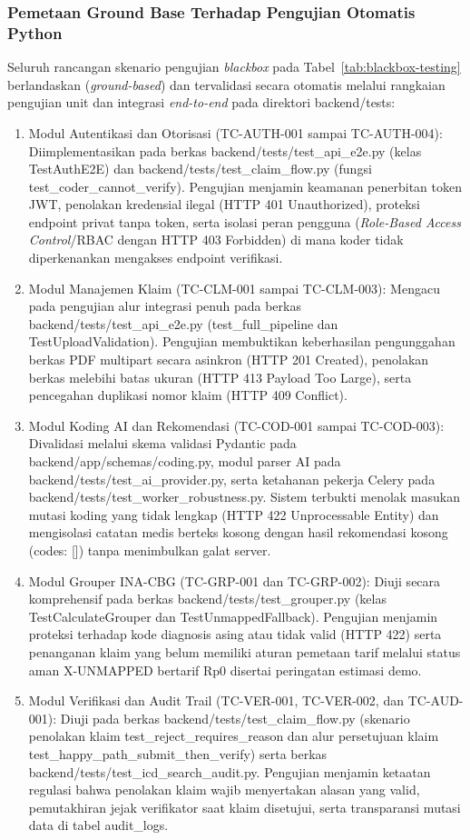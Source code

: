 \subsubsection{Pemetaan Ground Base Terhadap Pengujian Otomatis Python}
Seluruh rancangan skenario pengujian \textit{blackbox} pada Tabel~\ref{tab:blackbox-testing} berlandaskan (\textit{ground-based}) dan tervalidasi secara otomatis melalui rangkaian pengujian unit dan integrasi \textit{end-to-end} pada direktori backend/tests:
\begin{enumerate}[leftmargin=1.5em, itemsep=2pt]
  \item Modul Autentikasi dan Otorisasi (TC-AUTH-001 sampai TC-AUTH-004): Diimplementasikan pada berkas backend/tests/test\_api\_e2e.py (kelas TestAuthE2E) dan backend/tests/test\_claim\_flow.py (fungsi test\_coder\_cannot\_verify). Pengujian menjamin keamanan penerbitan token JWT, penolakan kredensial ilegal (HTTP 401 Unauthorized), proteksi endpoint privat tanpa token, serta isolasi peran pengguna (\textit{Role-Based Access Control}/RBAC dengan HTTP 403 Forbidden) di mana koder tidak diperkenankan mengakses endpoint verifikasi.
  \item Modul Manajemen Klaim (TC-CLM-001 sampai TC-CLM-003): Mengacu pada pengujian alur integrasi penuh pada berkas backend/tests/test\_api\_e2e.py (test\_full\_pipeline dan TestUploadValidation). Pengujian membuktikan keberhasilan pengunggahan berkas PDF multipart secara asinkron (HTTP 201 Created), penolakan berkas melebihi batas ukuran (HTTP 413 Payload Too Large), serta pencegahan duplikasi nomor klaim (HTTP 409 Conflict).
  \item Modul Koding AI dan Rekomendasi (TC-COD-001 sampai TC-COD-003): Divalidasi melalui skema validasi Pydantic pada backend/app/schemas/coding.py, modul parser AI pada backend/tests/test\_ai\_provider.py, serta ketahanan pekerja Celery pada backend/tests/test\_worker\_robustness.py. Sistem terbukti menolak masukan mutasi koding yang tidak lengkap (HTTP 422 Unprocessable Entity) dan mengisolasi catatan medis berteks kosong dengan hasil rekomendasi kosong (codes: []) tanpa menimbulkan galat server.
  \item Modul Grouper INA-CBG (TC-GRP-001 dan TC-GRP-002): Diuji secara komprehensif pada berkas backend/tests/test\_grouper.py (kelas TestCalculateGrouper dan TestUnmappedFallback). Pengujian menjamin proteksi terhadap kode diagnosis asing atau tidak valid (HTTP 422) serta penanganan klaim yang belum memiliki aturan pemetaan tarif melalui status aman X-UNMAPPED bertarif Rp0 disertai peringatan estimasi demo.
  \item Modul Verifikasi dan Audit Trail (TC-VER-001, TC-VER-002, dan TC-AUD-001): Diuji pada berkas backend/tests/test\_claim\_flow.py (skenario penolakan klaim test\_reject\_requires\_reason dan alur persetujuan klaim test\_happy\_path\-\_submit\-\_then\-\_verify) serta berkas backend/\-tests/\-test\_icd\-\_search\-\_audit.py. Pengujian menjamin ketaatan regulasi bahwa penolakan klaim wajib menyertakan alasan yang valid, pemutakhiran jejak verifikator saat klaim disetujui, serta transparansi mutasi data di tabel audit\_logs.
\end{enumerate}

